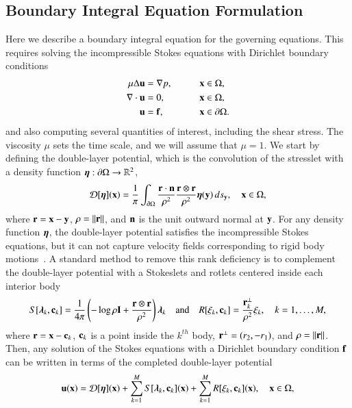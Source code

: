 \documentclass[preprint, 10pt]{elsarticle}
\begin{document}
\subsection{Boundary Integral Equation Formulation} 
\label{sec:bies}
Here we describe a boundary integral equation for the governing
equations.   This requires solving the incompressible Stokes equations
with Dirichlet boundary conditions 
\begin{alignat*}{3}
  \mu\Delta {\mathbf{u}} &= {\nabla} p, \qquad && {\mathbf{x}} \in \Omega, \\
  {\nabla} \cdot {\mathbf{u}} &= 0,   && {\mathbf{x}} \in \Omega, \\
  {\mathbf{u}} &= {\mathbf{f}},  && {\mathbf{x}} \in {\partial}\Omega.
\end{alignat*}
and also computing several quantities of interest, including the shear
stress.  The viscosity $\mu$ sets the time scale, and we will assume
that $\mu=1$.  We start by defining the double-layer potential, which is
the convolution of the stresslet with a density function
${\boldsymbol\eta}:{\partial}\Omega \rightarrow {\mathbb{R}}^2$,
\begin{align}
  {\mathcal{D}}[{\boldsymbol\eta}]({\mathbf{x}}) = \frac{1}{\pi} \int_{{\partial}\Omega} 
    \frac{{\mathbf{r}} \cdot {\mathbf{n}}}{\rho^2} \frac{{\mathbf{r}} \otimes {\mathbf{r}}}{\rho^2} 
    {\boldsymbol\eta}({\mathbf{y}}) \, ds_{\mathbf{y}}, \quad {\mathbf{x}} \in \Omega,
    \label{eqn:velocityDLP}
\end{align}
where ${\mathbf{r}} = {\mathbf{x}} - {\mathbf{y}}$, $\rho = \|{\mathbf{r}}\|$, and ${\mathbf{n}}$ is the unit outward
normal at ${\mathbf{y}}$.  For any density function ${\boldsymbol\eta}$, the double-layer
potential satisfies the incompressible Stokes equations, but it can not
capture velocity fields corresponding to rigid body
motions~\cite{pow-mir1987}.  A standard method to remove this rank
deficiency is to complement the double-layer potential with a Stokeslets
and rotlets centered inside each interior body
\begin{align}
  S[{\boldsymbol\lambda}_k,{\mathbf{c}}_k] = \frac{1}{4\pi} \left(-\log \rho {\mathbf{I}} + 
    \frac{{\mathbf{r}} \otimes {\mathbf{r}}}{\rho^2} \right){\boldsymbol\lambda}_k
  \quad \text{and} \quad
  R[\xi_k,{\mathbf{c}}_k] = \frac{{\mathbf{r}}_k^\perp}{\rho^2}\xi_k, 
  \quad k=1,\ldots,M,
  \label{eqn:stokeslet_rotlet}
\end{align}
where  ${\mathbf{r}} = {\mathbf{x}} - {\mathbf{c}}_k$, ${\mathbf{c}}_k$ is a point inside the $k^{th}$ body,
${\mathbf{r}}^\perp = (r_2,-r_1)$, and $\rho = \|{\mathbf{r}}\|$.  Then, any solution of
the Stokes equations with a Dirichlet boundary condition ${\mathbf{f}}$ can be
written in terms of the completed double-layer potential
\begin{align}
  \label{eqn:completed_DLP}
  {\mathbf{u}}({\mathbf{x}}) = {\mathcal{D}}[{\boldsymbol\eta}]({\mathbf{x}}) + \sum_{k=1}^{M} S[{\boldsymbol\lambda}_k,{\mathbf{c}}_k]({\mathbf{x}}) +
              \sum_{k=1}^{M} R[\xi_k,{\mathbf{c}}_k]({\mathbf{x}}), \quad {\mathbf{x}} \in \Omega,
\end{align}
\end{document}
